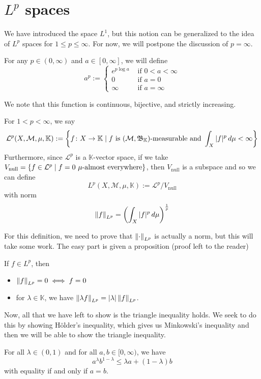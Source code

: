 \documentclass[11pt,leqno,oneside]{amsbook}
\numberwithin{thm}{section}
\newcommand{\M}{\mathcal{M}} %
\newcommand{\cL}{\mathcal{L}}
\newcommand{\K}{\mathbb{K}} %
\begin{document}
\section{\(L^p\) spaces}
We have introduced the space \(L^1\), but this notion can be
generalized to the idea of \(L^p\) spaces for \(1 \leq p \leq
\infty\). For now, we will postpone the discussion of \(p = \infty\).
\begin{defn}
  For any \(p \in (0,\infty)\) and \(a \in [0,\infty]\), we will
  define \[
    a^p :=
    \begin{cases}
      e^{p \log a} & \text{ if } 0 < a < \infty \\
      0 & \text{ if } a = 0 \\
      \infty & \text{ if } a = \infty
    \end{cases}
  \]
\end{defn}
We note that this function is continuous, bijective, and strictly
increasing.
\begin{defn}
  For \(1 < p < \infty\), we say \[
    \cL^p(X,\M,\mu,\K) := \left\{ f \from X \to \K \st f \text{ is
      }(\M,\B_\K)\text{-measurable and }\int_X |f|^p \d\mu < \infty \right\}
  \]
  Furthermore, since \(\cL^p\) is a \(\K\)-vector space, if we take
  \(V_\text{null} = \{f \in \cL^p \st f=0\
  \mu\text{-almost everywhere}\}\), then \(V_\text{null}\) is a
  subspace and so we can define \[
    L^p(X,\M,\mu,\K) := \cL^p/V_\text{null}
  \]
  with norm \[
    \norm[f]_{L^p} = \left( \int_X |f|^p \d\mu \right)^{\frac{1}{p}}
  \]
\end{defn}
For this definition, we need to prove that \(\norm_{L^p}\) is actually
a norm, but this will take some work. The easy part is given a
proposition (proof left to the reader)
\begin{prop}
  If \(f \in L^p\), then
  \begin{itemize}
  \item \(\norm[f]_{L^p} = 0 \iff f = 0\)
  \item for \(\lambda \in \K\), we have \(\norm[\lambda f]_{L^p} = |\lambda|\norm[f]_{L^p}\).
  \end{itemize}
\end{prop}
Now, all that we have left to show is the triangle inequality
holds. We seek to do this by showing H\"{o}lder's inequality, which
gives us Minkowski's inequality and then we will be able to show the
triangle inequality.
\begin{lem}
  For all \(\lambda \in (0,1)\) and for all \(a,b \in [0,\infty)\), we
  have \[
    a^\lambda b^{1-\lambda} \leq \lambda a + (1-\lambda)b
  \]
  with equality if and only if \(a=b\).
\end{lem}
\end{document}

